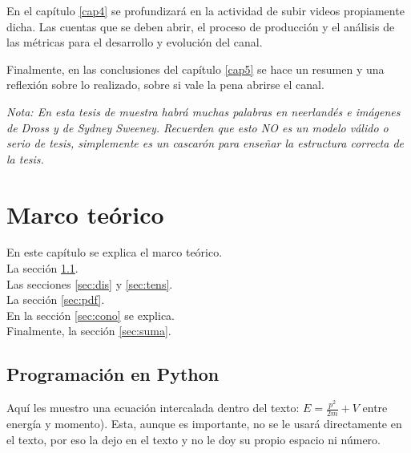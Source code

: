 \documentclass[letter,twoside,12pt]{book}
\begin{document}
En el capítulo \ref{cap4} se profundizará en la actividad de subir videos propiamente dicha. Las cuentas que se deben abrir, el proceso de producción y el análisis de las métricas para el desarrollo y evolución del canal.

Finalmente, en las conclusiones del capítulo \ref{cap5} se hace un resumen y una reflexión sobre lo realizado, sobre si vale la pena abrirse el canal.

\textit{Nota: En esta tesis de muestra habrá muchas palabras en neerlandés e imágenes de Dross y de Sydney Sweeney. Recuerden que esto NO es un modelo válido o serio de tesis, simplemente es un cascarón para enseñar la estructura correcta de la tesis.}
\chapter{Marco teórico}\label{cap2}
En este capítulo se explica el marco teórico. \\
La sección \ref{sec:dirac}.\\
Las secciones \ref{sec:dis} y \ref{sec:tens}.\\
La sección \ref{sec:pdf}.\\
En la sección \ref{sec:cono} se explica.\\
Finalmente, la sección \ref{sec:suma}.


\section{Programación en Python}\label{sec:dirac}
Aquí les muestro una ecuación intercalada dentro del texto: $E=\frac{p^2}{2m}+V$ entre energía y momento). 
Esta, aunque es importante, no se le usará directamente en el texto, por eso la dejo en el texto y no le doy su propio espacio ni número.
\end{document}
